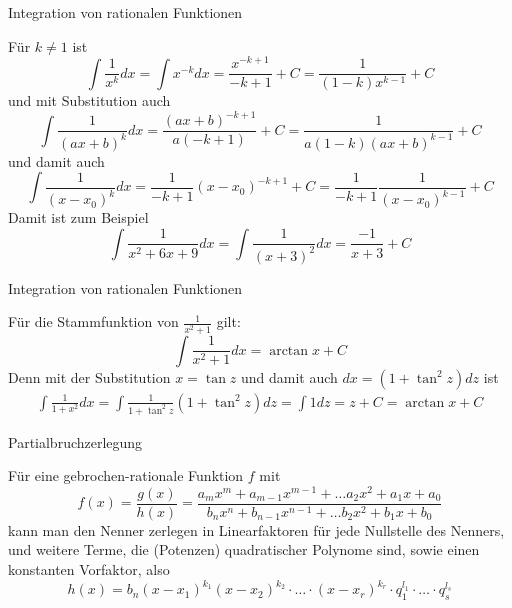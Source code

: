 \begin{frame}{Integration von rationalen Funktionen}
	\small{\begin{example}
		Für $k\neq 1 $ ist
		\[
			\int \frac{1}{x^{k}} dx = \int x^{-k} dx = \frac{x^{-k+1}}{-k+1} + C = \frac{1}{(1-k)x^{k-1}} + C
		\]	
		und mit Substitution auch
		\[
			\int \frac{1}{(ax+b)^{k}} dx = \frac{(ax+b)^{-k+1}}{a(-k+1)} +C = \frac{1}{a(1-k)(ax+b)^{k-1}} +C
		\]
		und damit auch
		\[
			\int\frac{1}{(x-x_{0})^{k}}dx = \frac{1}{-k+1}(x-x_{0})^{-k+1} + C = \frac{1}{-k+1}\frac{1}{(x-x_{0})^{k-1}} +C 
		\]
		Damit ist zum Beispiel
		\[
			\int \frac{1}{x^2 +6x +9} dx = \int \frac{1}{(x+3)^{2}}dx = \frac{-1}{x+3} +C
		\]
	\end{example}
}	
\end{frame}

\begin{frame}{Integration von rationalen Funktionen}
	\small{\begin{example}
		Für die Stammfunktion von $\frac{1}{x^2 + 1}$ gilt:
		\[
			\int \frac{1}{x^2+1} dx = \arctan x + C	
		\]
		Denn mit der Substitution $x= \tan z$ und damit auch $dx = (1+\tan^{2}z ) dz$ ist  
		\begin{align*}
			\int \frac{1}{1+x^2}dx = \int \frac{1}{1+\tan^{2}z} (1+\tan^{2}z)dz = \int 1 dz = z+ C = \arctan x + C
		\end{align*}
	\end{example}
}
\end{frame}


\begin{frame}{Partialbruchzerlegung}
\begin{bemerkung}
		Für eine gebrochen-rationale Funktion $f$ mit
		\[
			f(x)=\frac{g(x)}{h(x)} = \frac{a_{m}x^{m} + a_{m-1}x^{m-1} + \ldots a_{2}x^{2}+a_{1}x + a_{0}}{b_{n}x^{n} + b_{n-1}x^{n-1} + \ldots b_{2}x^{2}+b_{1}x + b_{0}}
		\]
		kann man den Nenner zerlegen in Linearfaktoren für jede Nullstelle des Nenners, und weitere Terme, die (Potenzen) quadratischer Polynome sind, sowie einen konstanten Vorfaktor, also
		\[
			h(x)=b_{n}(x-x_{1})^{k_{1}}(x-x_{2})^{k_{2}}\cdot \ldots \cdot (x-x_{r})^{k_{r}}\cdot q_{1}^{l_{1}}\cdot \ldots \cdot q_{s}^{l_{s}}
		\]
\end{bemerkung}
\end{frame}

